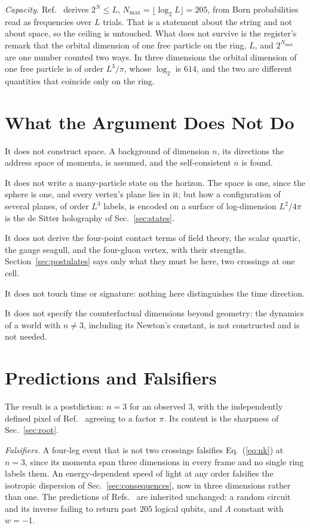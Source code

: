 \documentclass[aps,prd,twocolumn,superscriptaddress,nofootinbib]{revtex4-2}
\begin{document}
\textit{Capacity.} Ref.~\cite{korytko2026c} derives $2^N \le L$, $N_{\max} = \lfloor\log_2L\rfloor = 205$, from Born probabilities read as frequencies over $L$ trials. That is a statement about the string and not about space, so the ceiling is untouched. What does not survive is the register's remark that the orbital dimension of one free particle on the ring, $L$, and $2^{N_{\max}}$ are one number counted two ways. In three dimensions the orbital dimension of one free particle is of order $L^3/\pi$, whose $\log_2$ is $614$, and the two are different quantities that coincide only on the ring.

\section{What the Argument Does Not Do}
\label{sec:limits}

It does not construct space. A background of dimension $n$, its directions the address space of momenta, is assumed, and the self-consistent $n$ is found.

It does not write a many-particle state on the horizon. The space is one, since the sphere is one, and every vertex's plane lies in it; but how a configuration of several planes, of order $L^3$ labels, is encoded on a surface of log-dimension $L^2/4\pi$ is the de Sitter holography of Sec.~\ref{sec:states}.

It does not derive the four-point contact terms of field theory, the scalar quartic, the gauge seagull, and the four-gluon vertex, with their strengths. Section~\ref{sec:postulates} says only what they must be here, two crossings at one cell.

It does not touch time or signature: nothing here distinguishes the time direction.

It does not specify the counterfactual dimensions beyond geometry: the dynamics of a world with $n \ne 3$, including its Newton's constant, is not constructed and is not needed.

\section{Predictions and Falsifiers}
\label{sec:pred}

The result is a postdiction: $n = 3$ for an observed $3$, with the independently defined pixel of Ref.~\cite{korytko2026} agreeing to a factor $\pi$. Its content is the sharpness of Sec.~\ref{sec:root}.

\textit{Falsifiers.} A four-leg event that is not two crossings falsifies Eq.~(\ref{eq:nk}) at $n = 3$, since its momenta span three dimensions in every frame and no single ring labels them. An energy-dependent speed of light at any order falsifies the isotropic dispersion of Sec.~\ref{sec:consequences}, now in three dimensions rather than one. The predictions of Refs.~\cite{korytko2026,korytko2026c} are inherited unchanged: a random circuit and its inverse failing to return past $205$ logical qubits, and $\Lambda$ constant with $w = -1$.
\end{document}
